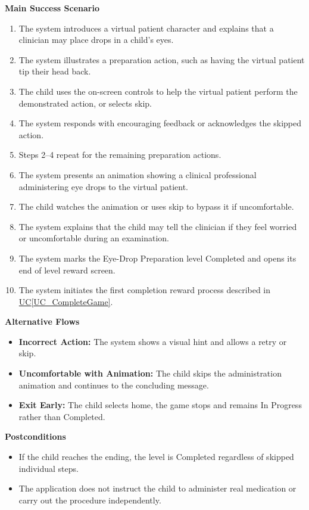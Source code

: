 \documentclass[12pt]{article}
\newcommand{\ucref}[1]{\hyperref[#1]{UC\ref*{#1}}}
\begin{document}
\textbf{Main Success Scenario}
\begin{enumerate}
    \item The system introduces a virtual patient character and
    explains that a clinician may place drops in a child's eyes.
    \item The system illustrates a preparation action, such as having
    the virtual patient tip their head back.
    \item The child uses the on-screen controls to help the virtual
    patient perform the demonstrated action, or selects skip.
    \item The system responds with encouraging feedback or
    acknowledges the skipped action.
    \item Steps 2--4 repeat for the remaining preparation actions.
    \item The system presents an animation showing a clinical
    professional administering eye drops to the virtual patient.
    \item The child watches the animation or uses skip to bypass
    it if uncomfortable.
    \item The system explains that the child may tell the clinician
    if they feel worried or uncomfortable during an examination.
    \item The system marks the Eye-Drop Preparation level Completed
    and opens its end of level reward screen.
    \item The system initiates the first completion reward process
    described in \ucref{UC_CompleteGame}.
\end{enumerate}

\textbf{Alternative Flows}
\begin{itemize}
    \item \textbf{Incorrect Action:} The system shows a visual hint
    and allows a retry or skip.
    \item \textbf{Uncomfortable with Animation:} The child skips the
    administration animation and continues to the concluding message.
    \item \textbf{Exit Early:} The child selects home, the game
    stops and remains In Progress rather than Completed.
\end{itemize}

\textbf{Postconditions}
\begin{itemize}
    \item If the child reaches the ending, the level is Completed
    regardless of skipped individual steps.
    \item The application does not instruct the child to administer
    real medication or carry out the procedure independently.
\end{itemize}
\end{document}
